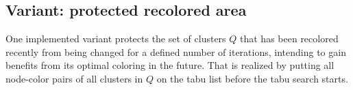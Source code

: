 \subsection{Variant: protected recolored area}
One implemented variant protects the set of clusters $Q$ that has been recolored recently from being changed for a defined number of iterations, intending to gain benefits from its optimal coloring in the future. That is realized by putting all node-color pairs of all clusters in $Q$ on the tabu list before the tabu search starts.
